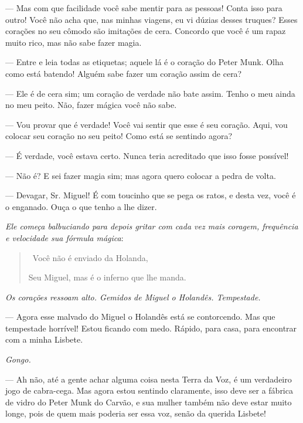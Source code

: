 \begin{myparindent}{0pt}
\begin{Parskip}
 --- Mas com que facilidade você sabe mentir para as
pessoas! Conta isso para outro! Você não acha que, nas minhas viagens,
eu vi dúzias desses truques? Esses corações no seu cômodo são imitações
de cera. Concordo que você é um rapaz muito rico, mas não sabe fazer
magia.

 --- Entre e leia todas as etiquetas; aquele lá é o
coração do Peter Munk. Olha como está batendo! Alguém sabe fazer um
coração assim de cera?

 --- Ele é de cera sim; um coração de verdade não
bate assim. Tenho o meu ainda no meu peito. Não, fazer mágica você não
sabe.

 --- Vou provar que é verdade! Você vai sentir que esse
é seu coração. Aqui, vou colocar seu coração no seu peito! Como está se
sentindo agora?

 --- É verdade, você estava certo. Nunca teria
acreditado que isso fosse possível!

 --- Não é? E sei fazer magia sim; mas agora quero
colocar a pedra de volta.

 --- Devagar, Sr. Miguel! É com toucinho que se pega
os ratos, e desta vez, você é o enganado. Ouça o que tenho a lhe dizer.

\emph{Ele começa balbuciando para depois gritar com cada vez mais
coragem, frequência e velocidade sua fórmula mágica}:

\begin{quote}
\quad \, Você não é enviado da Holanda,

Seu Miguel, mas é o inferno que lhe manda.
\end{quote}

\emph{Os corações ressoam alto. Gemidos de Miguel o Holandês.
Tempestade.}

 --- Agora esse malvado do Miguel o Holandês está se
contorcendo. Mas que tempestade horrível! Estou ficando com medo.
Rápido, para casa, para encontrar com a minha Lisbete.

\emph{Gongo.}

 --- Ah não, até a gente achar alguma coisa nesta Terra da Voz, é
um verdadeiro jogo de cabra-cega. Mas agora estou sentindo claramente,
isso deve ser a fábrica de vidro do Peter Munk do Carvão, e sua mulher
também não deve estar muito longe, pois de quem mais poderia ser essa
voz, senão da querida Lisbete!


\end{Parskip}
\end{myparindent}
